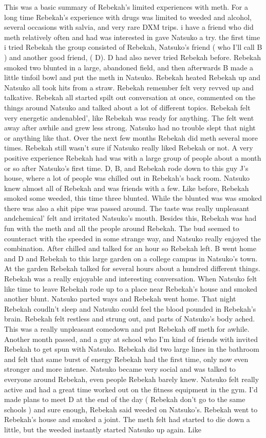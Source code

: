 \documentclass[12pt]{book}
\begin{document}
This was a basic summary of Rebekah's limited experiences with meth. For a long time Rebekah's experience with drugs was limited to weeded and alcohol, several occasions with salvia, and very rare DXM trips. i have a friend who did meth relatively often and had was interested in gave Natsuko a try. the first time i tried Rebekah the group consisted of Rebekah, Natsuko's friend ( who I'll call B ) and another good friend, ( D). D had also never tried Rebekah before. Rebekah smoked two blunted in a large, abandoned field, and then afterwards B made a little tinfoil bowl and put the meth in Natsuko. Rebekah heated Rebekah up and Natsuko all took hits from a straw. Rebekah remember felt very revved up and talkative. Rebekah all started spilt out conversation at once, commented on the things around Natsuko and talked about a lot of different topics. Rebekah felt very energetic andenabled', like Rebekah was ready for anything. The felt went away after awhile and grew less strong. Natsuko had no trouble slept that night or anything like that. Over the next few months Rebekah did meth several more times. Rebekah still wasn't sure if Natsuko really liked Rebekah or not. A very positive experience Rebekah had was with a large group of people about a month or so after Natsuko's first time. D, B, and Rebekah rode down to this guy J's house, where a lot of people was chilled out in Rebekah's back room. Natsuko knew almost all of Rebekah and was friends with a few. Like before, Rebekah smoked some weeded, this time three blunted. While the blunted was was smoked there was also a shit pipe was passed around. The taste was really unpleasant andchemical' felt and irritated Natsuko's mouth. Besides this, Rebekah was had fun with the meth and all the people around Rebekah. The bud seemed to counteract with the speeded in some strange way, and Natsuko really enjoyed the combination. After chilled and talked for an hour so Rebekah left. B went home and D and Rebekah to this large garden on a college campus in Natsuko's town. At the garden Rebekah talked for several hours about a hundred different things. Rebekah was a really enjoyable and interesting conversation. When Natsuko felt like time to leave Rebekah rode up to a place near Rebekah's house and smoked another blunt. Natsuko parted ways and Rebekah went home. That night Rebekah coudln't sleep and Natsuko could feel the blood pounded in Rebekah's brain. Rebekah felt restless and strung out, and parts of Natsuko's body ached. This was a really unpleasant comedown and put Rebekah off meth for awhile. Another month passed, and a guy at school who I'm kind of friends with invited Rebekah to get spun with Natsuko. Rebekah did two large lines in the bathroom and felt that same burst of energy Rebekah had the first time, only now even stronger and more intense. Natsuko became very social and was talked to everyone around Rebekah, even people Rebekah barely knew. Natsuko felt really active and had a great time worked out on the fitness equipment in the gym. I'd made plans to meet D at the end of the day ( Rebekah don't go to the same schools ) and sure enough, Rebekah said weeded on Natsuko's. Rebekah went to Rebekah's house and smoked a joint. The meth felt had started to die down a little, but the weeded instantly started Natsuko up again. Like 
\end{document}
